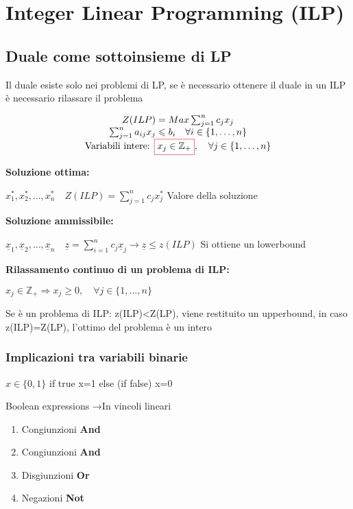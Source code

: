 \chapter{Integer Linear Programming (ILP)}
\section{Duale come sottoinsieme di LP}
Il duale esiste solo nei problemi di LP, se è necessario ottenere il duale in un ILP è necessario rilassare il problema

\[
    \begin{array}{c}
        Z(ILP)=Max \sum_{j=1}^n c_jx_j\\
         \sum_{j=1}^n a_{ij}x_j \leqslant b_i \quad \forall i \in\{1, \ldots, n\}\\
          \text{Variabili intere: } \fcolorbox{red}{white}{$x_j \in \mathbb{Z}_+$}, \quad \forall j \in\{1, \ldots, n\}
    \end{array}
\]

\textbf{Soluzione ottima:}

$x_1^*, x_2^*, \ldots, x_n^* \quad Z(ILP)=\sum_{j=1}^n c_j x_j^*$ Valore della soluzione

\textbf{Soluzione ammissibile:}

$\underline{x}_1, \underline{x}_2, \ldots, \underline{x}_n \quad \underline{z}=\sum_{i=1}^{n} c_j \underline{x}_j \rightarrow \underline{z} \leqslant z(ILP)$ Si ottiene un lowerbound

\textbf{ Rilassamento continuo di un problema di ILP:}

$x_j \in \mathbb{Z}_+ \Longrightarrow x_j \geqslant 0 , \quad \forall j \in\{1, \ldots, n\}$

Se è un problema di ILP: z(ILP)<Z(LP), viene restituito un upperbound, in caso z(ILP)=Z(LP), l’ottimo del problema è un intero

\subsection{Implicazioni tra variabili binarie}
$x \in \{0,1\}$ if true x=1 else (if false) x=0

Boolean expressions →In vincoli lineari
\begin{enumerate}
    \item Congiunzioni \textbf{And}
    \item Congiunzioni \textbf{And}
    \item Disgiunzioni \textbf{Or}
    \item Negazioni \textbf{Not}
\end{enumerate}

